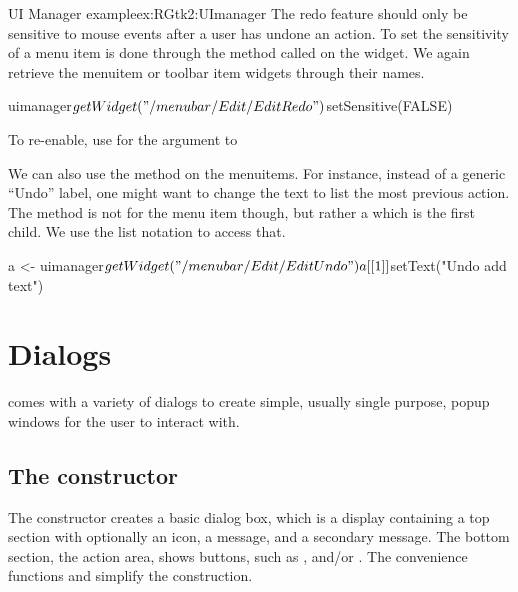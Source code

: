 \begin{example}{UI Manager example}{ex:RGtk2:UImanager}
The redo feature should only be sensitive to mouse events after a user
has undone an action. To set the sensitivity
of a menu item is done through the  method called
on the widget. We again retrieve the menuitem or toolbar item widgets
through their names.

\begin{Schunk}
\begin{Sinput}
 uimanager$getWidget("/menubar/Edit/EditRedo")$setSensitive(FALSE)
\end{Sinput}
\end{Schunk}
To re-enable, use  for the argument to 

We can also use the  method on the menuitems. For
instance, instead of a generic ``Undo'' label, one might want to
change the text to list the most previous action.  The method is not
for the menu item though, but rather a  which is the
first child. We use the list notation to access that.
\begin{Schunk}
\begin{Sinput}
 a <- uimanager$getWidget("/menubar/Edit/EditUndo")
 a[[1]]$setText("Undo add text")
\end{Sinput}
\end{Schunk}
\end{example}


\label{sec:RGtk2:dialogs}

\section{Dialogs}
\label{sec:dialogs}
\GTK\/ comes with a variety of dialogs to create simple, usually
single purpose, popup windows
for the user to interact with.

\subsection{The  constructor}

The constructor  creates a basic dialog box,
which is a display containing a top section with optionally an icon, a
message, and a secondary message. The bottom section, the action area,
shows buttons, such as ,  and/or
. The convenience functions
 and
 simplify the construction.

